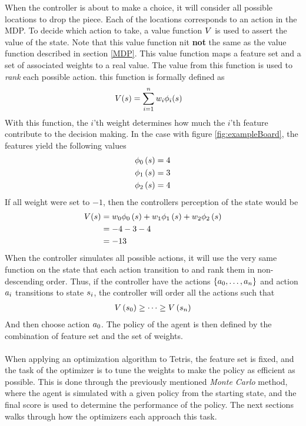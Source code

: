When the controller is about to make a choice, it will
consider all possible locations to drop the piece. Each
of the locations corresponds to an action in the MDP.
To decide which action to take, a value function $V$
is used to assert the value of the state. Note that 
this value function nit \textbf{not} the same as the value 
function described in section \ref{MDP}. This value function
maps a feature set and a set of associated weights to a real value.
The value from this function is used to \textit{rank} each possible action.
this function is formally defined as
\begin{align}
V (s ) &= 
\sum_{i=1}^{n} w _{i}\phi _{i}(s )
\end{align}
With this function, the $i$'th weight determines how
much the $i$'th feature contribute to the decision making.
In the case with figure \ref{fig:exampleBoard}, the features yield
the following values
\begin{align}
\phi_0 \left( s \right) = 4\\
\phi_1 \left( s \right) = 3\\
\phi_2 \left( s \right) = 4
\end{align}
If all weight were set to $-1$, then the controllers perception 
of the state would be
\begin{align}
V (s ) &= 
w_0 \phi_0 \left( s \right) + 
w_1 \phi_1 \left( s \right) + 
w_2 \phi_2 \left( s \right)\\
&= -4 -3 -4\\
&= -13
\end{align}
When the controller simulates all possible actions, it will
use the very same function on the state that each action transition 
to and rank them in non-descending order. Thus, if the controller
have the actions $\{a_0,\dots,a_n\}$ and action 
$a_i$ transitions to state $s_i$, the controller will
order all the actions such that
\begin{align}
V \left( s_0 \right) \geq \dots \geq 
V \left( s_n \right)
\end{align} 
And then choose action $a_0$. The policy of the agent 
is then defined by the combination of feature set and the set of weights.\\
\\
When applying an optimization algorithm to Tetris, the feature set is 
fixed, and the task of the optimizer is to tune the weights to make the 
policy as efficient as possible. This is done through the previously 
mentioned \textit{Monte Carlo} method, where the agent is simulated
with a given policy from the starting state, and the final score is 
used to determine the performance of the policy. The next sections 
walks through how the optimizers each approach this task.

